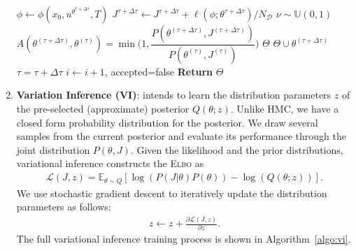 \begin{enumerate}
\begin{algorithm}[H]
\begin{algorithmic}[1]
                    \State $\phi \leftarrow \phi(x_0, u^{\theta^{\tau + \Delta \tau}}, T) $
                    \State $J^{\tau + \Delta \tau}  \gets J^{\tau + \Delta \tau}  + \ell(\phi; \theta^{\tau + \Delta \tau})/N_{\mathcal{D}}$ 
                \EndFor
                \State $\nu \sim \mathbb{U}(0, 1)$
                \State $A(\theta^{(\tau + \Delta \tau)}, \theta^{(\tau)}) = \min \Biggl(1, \dfrac{P(\theta^{(\tau + \Delta \tau)}, J^{(\tau + \Delta \tau)})}{P(\theta^{(\tau)}, J^{(\tau)})} \Biggr)$
                    \State $\Theta$ \leftarrow \; $\Theta \cup \theta^{(\tau + \Delta \tau)}$ 
                    \State $\tau = \tau + \Delta \tau$
                    \Else
                    \State $i \leftarrow i + 1$, accepted=false 
                \EndIf
            \EndWhile
        \EndWhile
        \State \textbf{Return} $\Theta$
        \end{algorithmic}
    \end{algorithm}

    \item \textbf{Variation Inference (VI)}: intends to learn the distribution
    parameters $z$ of the pre-selected (approximate) posterior $Q(\theta; z)$.
    Unlike HMC, we have a closed form probability distribution for the
    posterior. We draw several samples from the current posterior and evaluate
    its performance through the joint distribution $P(\theta, J)$. Given the
    likelihood and the prior distributions, variational inference constructs the
    \textsc{Elbo} as
    \begin{align}
        \mathcal{L}(J,z) = \mathbb{E}_{\theta \sim Q} \left[\log(P(J | \theta)P(\theta)) - \log(Q(\theta;z)) \right].    
        \label{eq:neuralpbc_elbo}    
    \end{align}
    We use stochastic gradient descent to iteratively update the distribution
    parameters as follows:
    \begin{align*}
      z \leftarrow z + \frac{ \partial \mathcal{L}(J,z)}{\partial z}.
    \end{align*}
    The full variational inference training process is shown in
    Algorithm~\eqref{algo:vi}.
    

\end{enumerate}
